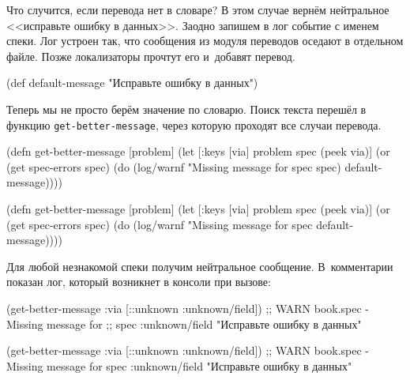 Что случится, если перевода нет в словаре? В этом случае вернём нейтральное
<<исправьте ошибку в данных>>. Заодно запишем в лог событие с именем спеки. Лог
устроен так, что сообщения из модуля переводов оседают в отдельном файле. Позже
локализаторы прочтут его и~добавят перевод.

\begin{clojure}
(def default-message
  "Исправьте ошибку в данных")
\end{clojure}

\pagebreaklarge

Теперь мы не просто берём значение по словарю. Поиск текста перешёл в функцию
\texttt{get-\-better-\-message}, через которую проходят все случаи перевода.

\ifnarrow


\begin{clojure}
(defn get-better-message [problem]
  (let [{:keys [via]} problem
        spec (peek via)]
    (or (get spec-errors spec)
        (do
          (log/warnf
            "Missing message for spec %
            spec)
          default-message))))
\end{clojure}


\else


\begin{clojure}
(defn get-better-message [problem]
  (let [{:keys [via]} problem
        spec (peek via)]
    (or (get spec-errors spec)
        (do (log/warnf "Missing message for spec %
            default-message))))
\end{clojure}


\fi

Для любой незнакомой спеки получим нейтральное сообщение. В~комментарии показан
лог, который возникнет в консоли при вызове:

\ifnarrow

\begin{clojure}
(get-better-message
    {:via [::unknown :unknown/field]})
;; WARN book.spec - Missing message for
;; spec :unknown/field
"Исправьте ошибку в данных"
\end{clojure}

\else

\begin{clojure}
(get-better-message {:via [::unknown :unknown/field]})
;; WARN book.spec - Missing message for spec :unknown/field
"Исправьте ошибку в данных"
\end{clojure}

\fi

